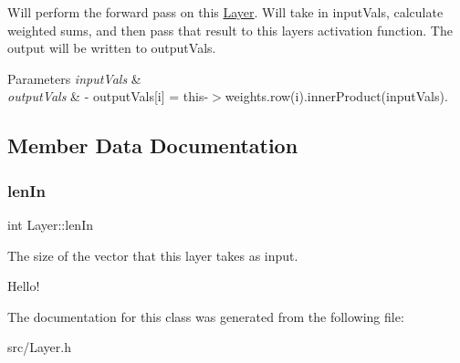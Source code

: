 Will perform the forward pass on this \hyperlink{classLayer}{Layer}. Will take in {\ttfamily input\+Vals}, calculate weighted sums, and then pass that result to this layer\textquotesingle{}s activation function. The output will be written to {\ttfamily output\+Vals}. 
\begin{DoxyParams}{Parameters}
{\em input\+Vals} & \\
\hline
{\em output\+Vals} & -\/ output\+Vals\mbox{[}i\mbox{]} = this-\/$>$weights.\+row(i).inner\+Product(input\+Vals). \\
\hline
\end{DoxyParams}


\subsection{Member Data Documentation}
\mbox{\label{classLayer_a5f699c67410ebc5acad98cc5d3a9b5ec}} 
\subsubsection{\texorpdfstring{len\+In}{lenIn}}
{\footnotesize\ttfamily int Layer\+::len\+In}



The size of the vector that this layer takes as input. 

Hello! 

The documentation for this class was generated from the following file\+:\begin{DoxyCompactItemize}
\item 
src/Layer.\+h\end{DoxyCompactItemize}
